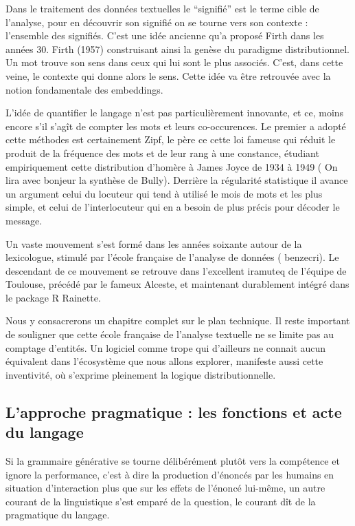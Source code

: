 \documentclass[
  letterpaper,
  DIV=11,
  numbers=noendperiod]{scrreprt}
\begin{document}
Dans le traitement des données textuelles le ``signifié'' est le terme
cible de l'analyse, pour en découvrir son signifié on se tourne vers son
contexte : l'ensemble des signifiés. C'est une idée ancienne qu'a
proposé Firth dans les années 30. Firth (1957) construisant ainsi la
genèse du paradigme distributionnel. Un mot trouve son sens dans ceux
qui lui sont le plus associés. C'est, dans cette veine, le contexte qui
donne alors le sens. Cette idée va être retrouvée avec la notion
fondamentale des embeddings.

L'idée de quantifier le langage n'est pas particulièrement innovante, et
ce, moins encore s'il s'agît de compter les mots et leurs co-occurences.
Le premier a adopté cette méthodes est certainement Zipf, le père ce
cette loi fameuse qui réduit le produit de la fréquence des mots et de
leur rang à une constance, étudiant empiriquement cette distribution
d'homère à James Joyce de 1934 à 1949 ( On lira avec bonjeur la synthèse
de Bully). Derrière la régularité statistique il avance un argument
celui du locuteur qui tend à utilisé le mois de mots et les plus simple,
et celui de l'interlocuteur qui en a besoin de plus précis pour décoder
le message.

Un vaste mouvement s'est formé dans les années soixante autour de la
lexicologue, stimulé par l'école française de l'analyse de données (
benzecri). Le descendant de ce mouvement se retrouve dans l'excellent
iramuteq de l'équipe de Toulouse, précédé par le fameux Alceste, et
maintenant durablement intégré dans le package R Rainette.

Nous y consacrerons un chapitre complet sur le plan technique. Il reste
important de souligner que cette école française de l'analyse textuelle
ne se limite pas au comptage d'entités. Un logiciel comme trope qui
d'ailleurs ne connait aucun équivalent dans l'écosystème que nous allons
explorer, manifeste aussi cette inventivité, où s'exprime pleinement la
logique distributionnelle.

\subsection{L'approche pragmatique : les fonctions et acte du
langage}\label{lapproche-pragmatique-les-fonctions-et-acte-du-langage}

Si la grammaire générative se tourne délibérément plutôt vers la
compétence et ignore la performance, c'est à dire la production
d'énoncés par les humains en situation d'interaction plus que sur les
effets de l'énoncé lui-même, un autre courant de la linguistique s'est
emparé de la question, le courant dît de la pragmatique du langage.
\end{document}
